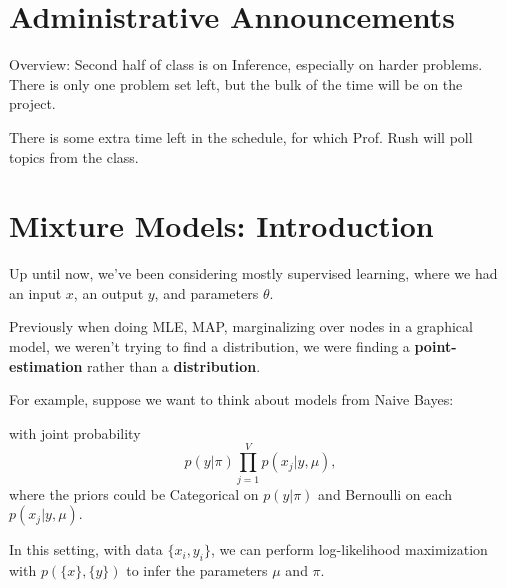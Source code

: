 \documentclass{article}
\begin{document}


\section{Administrative Announcements}

Overview:  Second half of class is on Inference, especially on harder problems.  There is only one problem set left, but the bulk of the time will be on the project.

There is some extra time left in the schedule, for which Prof. Rush will poll topics from the class.

\section{Mixture Models: Introduction}

Up until now, we've been considering mostly supervised learning, where we had an input $x$, an output $y$, and parameters $\theta$.

Previously when doing MLE, MAP, marginalizing over nodes in a graphical model, we weren't trying to find a distribution, we were finding a {\bf point-estimation} rather than a {\bf distribution}.

For example, suppose we want to think about models from Naive Bayes:


\begin{center}
\end{center}

with joint probability $$\displaystyle p(y | \pi) \prod_{j= 1}^V p(x_j | y, \mu),$$ where the priors could be Categorical on $p(y | \pi)$ and Bernoulli on each $p(x_j | y, \mu)$.  

In this setting, with data $\{x_i, y_i\}$, we can perform log-likelihood maximization with $p(\{x\}, \{y\})$ to infer the parameters $\mu$ and $\pi$.
\end{document}
